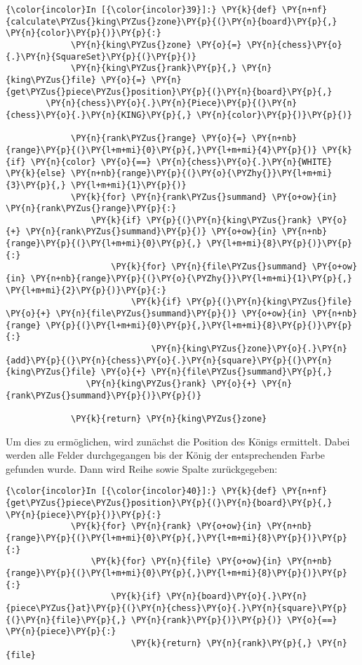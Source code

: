     \begin{Verbatim}[commandchars=\\\{\}]
{\color{incolor}In [{\color{incolor}39}]:} \PY{k}{def} \PY{n+nf}{calculate\PYZus{}king\PYZus{}zone}\PY{p}{(}\PY{n}{board}\PY{p}{,} \PY{n}{color}\PY{p}{)}\PY{p}{:}
             \PY{n}{king\PYZus{}zone} \PY{o}{=} \PY{n}{chess}\PY{o}{.}\PY{n}{SquareSet}\PY{p}{(}\PY{p}{)}
             \PY{n}{king\PYZus{}rank}\PY{p}{,} \PY{n}{king\PYZus{}file} \PY{o}{=} \PY{n}{get\PYZus{}piece\PYZus{}position}\PY{p}{(}\PY{n}{board}\PY{p}{,} 
		\PY{n}{chess}\PY{o}{.}\PY{n}{Piece}\PY{p}{(}\PY{n}{chess}\PY{o}{.}\PY{n}{KING}\PY{p}{,} \PY{n}{color}\PY{p}{)}\PY{p}{)}
         
             \PY{n}{rank\PYZus{}range} \PY{o}{=} \PY{n+nb}{range}\PY{p}{(}\PY{l+m+mi}{0}\PY{p}{,}\PY{l+m+mi}{4}\PY{p}{)} \PY{k}{if} \PY{n}{color} \PY{o}{==} \PY{n}{chess}\PY{o}{.}\PY{n}{WHITE} \PY{k}{else} \PY{n+nb}{range}\PY{p}{(}\PY{o}{\PYZhy{}}\PY{l+m+mi}{3}\PY{p}{,} \PY{l+m+mi}{1}\PY{p}{)}
             \PY{k}{for} \PY{n}{rank\PYZus{}summand} \PY{o+ow}{in} \PY{n}{rank\PYZus{}range}\PY{p}{:}
                 \PY{k}{if} \PY{p}{(}\PY{n}{king\PYZus{}rank} \PY{o}{+} \PY{n}{rank\PYZus{}summand}\PY{p}{)} \PY{o+ow}{in} \PY{n+nb}{range}\PY{p}{(}\PY{l+m+mi}{0}\PY{p}{,} \PY{l+m+mi}{8}\PY{p}{)}\PY{p}{:}
                     \PY{k}{for} \PY{n}{file\PYZus{}summand} \PY{o+ow}{in} \PY{n+nb}{range}\PY{p}{(}\PY{o}{\PYZhy{}}\PY{l+m+mi}{1}\PY{p}{,} \PY{l+m+mi}{2}\PY{p}{)}\PY{p}{:}
                         \PY{k}{if} \PY{p}{(}\PY{n}{king\PYZus{}file} \PY{o}{+} \PY{n}{file\PYZus{}summand}\PY{p}{)} \PY{o+ow}{in} \PY{n+nb}{range} \PY{p}{(}\PY{l+m+mi}{0}\PY{p}{,}\PY{l+m+mi}{8}\PY{p}{)}\PY{p}{:}
                             \PY{n}{king\PYZus{}zone}\PY{o}{.}\PY{n}{add}\PY{p}{(}\PY{n}{chess}\PY{o}{.}\PY{n}{square}\PY{p}{(}\PY{n}{king\PYZus{}file} \PY{o}{+} \PY{n}{file\PYZus{}summand}\PY{p}{,} 
				\PY{n}{king\PYZus{}rank} \PY{o}{+} \PY{n}{rank\PYZus{}summand}\PY{p}{)}\PY{p}{)}
             
             \PY{k}{return} \PY{n}{king\PYZus{}zone}
\end{Verbatim}

    Um dies zu ermöglichen, wird zunächst die Position des Königs ermittelt.
Dabei werden alle Felder durchgegangen bis der König der entsprechenden
Farbe gefunden wurde. Dann wird Reihe sowie Spalte zurückgegeben:

        \begin{Verbatim}[commandchars=\\\{\}]
{\color{incolor}In [{\color{incolor}40}]:} \PY{k}{def} \PY{n+nf}{get\PYZus{}piece\PYZus{}position}\PY{p}{(}\PY{n}{board}\PY{p}{,} \PY{n}{piece}\PY{p}{)}\PY{p}{:}
             \PY{k}{for} \PY{n}{rank} \PY{o+ow}{in} \PY{n+nb}{range}\PY{p}{(}\PY{l+m+mi}{0}\PY{p}{,}\PY{l+m+mi}{8}\PY{p}{)}\PY{p}{:}
                 \PY{k}{for} \PY{n}{file} \PY{o+ow}{in} \PY{n+nb}{range}\PY{p}{(}\PY{l+m+mi}{0}\PY{p}{,}\PY{l+m+mi}{8}\PY{p}{)}\PY{p}{:}
                     \PY{k}{if} \PY{n}{board}\PY{o}{.}\PY{n}{piece\PYZus{}at}\PY{p}{(}\PY{n}{chess}\PY{o}{.}\PY{n}{square}\PY{p}{(}\PY{n}{file}\PY{p}{,} \PY{n}{rank}\PY{p}{)}\PY{p}{)} \PY{o}{==} \PY{n}{piece}\PY{p}{:}
                         \PY{k}{return} \PY{n}{rank}\PY{p}{,} \PY{n}{file}
\end{Verbatim}

